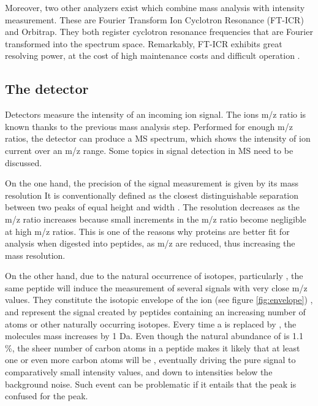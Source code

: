 Moreover, two other analyzers exist which combine mass analysis with intensity measurement. These are Fourier Transform Ion Cyclotron Resonance (\ac{FT-ICR}) and Orbitrap. They both register cyclotron resonance frequencies that are Fourier transformed into the spectrum space. Remarkably, \ac{FT-ICR} exhibits great resolving power, at the cost of high maintenance costs and difficult operation \cite{Barsnes2008}. 

\subsection{The detector}
\label{subsec:the_detector}

Detectors measure the intensity of an incoming ion signal. The ion\textquotesingle s \ac{m/z} ratio is known thanks to the previous mass analysis step. Performed for enough \ac{m/z} ratios, the detector can produce a \ac{MS} spectrum, which shows the intensity of ion current over an \ac{m/z} range. Some topics in signal detection in \ac{MS} need to be discussed.

On the one hand, the precision of the signal measurement is given by its mass resolution It is conventionally defined as the closest distinguishable separation between two peaks of equal height and width \cite{Marshall2013}. The resolution decreases as the \ac{m/z} ratio increases because small increments in the \ac{m/z} ratio become negligible at high \ac{m/z} ratios. This is one of the reasons why proteins are better fit for analysis when digested into peptides, as \ac{m/z} are reduced, thus increasing the mass resolution.

On the other hand, due to the natural occurrence of isotopes, particularly , the same peptide will induce the measurement of several signals with very close \ac{m/z} values. They constitute the isotopic envelope of the ion (see figure \ref{fig:envelope}) \cite{Mirzaei2016}, and represent the signal created by peptides containing an increasing number of  atoms or other naturally occurring isotopes. Every time a  is replaced by , the molecule\textquotesingle s mass increases by 1 Da. Even though the natural abundance of  is 1.1 \%, the sheer number of carbon atoms in a peptide makes it likely that at least one or even more carbon atoms will be , eventually driving the pure  signal to comparatively small intensity values, and down to intensities below the background noise. Such event can be problematic if it entails that the  peak is confused for the  peak.

